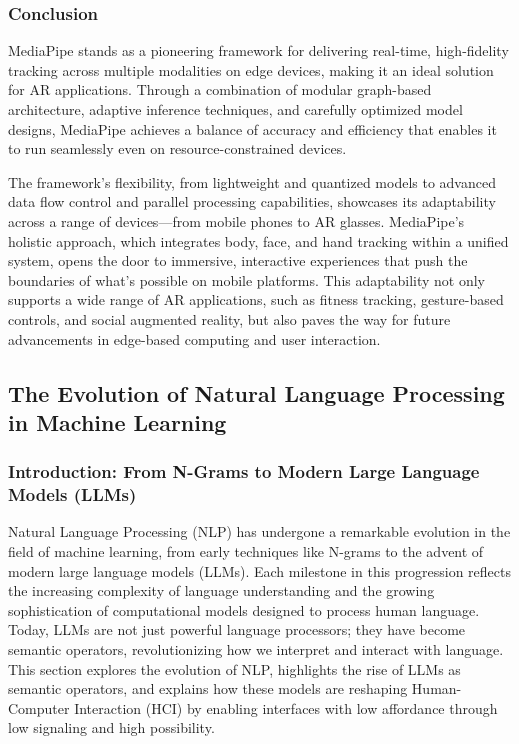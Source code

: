 \subsubsection{ Conclusion }

MediaPipe stands as a pioneering framework for delivering real-time, high-fidelity tracking across multiple modalities on edge devices, making it an ideal solution for AR applications.
Through a combination of modular graph-based architecture, adaptive inference techniques, and carefully optimized model designs, MediaPipe achieves a balance of accuracy and efficiency that enables it to run seamlessly even on resource-constrained devices.

The framework’s flexibility, from lightweight and quantized models to advanced data flow control and parallel processing capabilities, showcases its adaptability across a range of devices—from mobile phones to AR glasses.
MediaPipe’s holistic approach, which integrates body, face, and hand tracking within a unified system, opens the door to immersive, interactive experiences that push the boundaries of what’s possible on mobile platforms.
This adaptability not only supports a wide range of AR applications, such as fitness tracking, gesture-based controls, and social augmented reality, but also paves the way for future advancements in edge-based computing and user interaction.

\subsection{ The Evolution of Natural Language Processing in Machine Learning}

\subsubsection{ Introduction: From N-Grams to Modern Large Language Models (LLMs)}

Natural Language Processing (NLP) has undergone a remarkable evolution in the field of machine learning, from early techniques like N-grams \cite{Mar13} to the advent of modern large language models (LLMs).
Each milestone in this progression reflects the increasing complexity of language understanding and the growing sophistication of computational models designed to process human language.
Today, LLMs are not just powerful language processors; they have become semantic operators, revolutionizing how we interpret and interact with language. This section explores the evolution of NLP, highlights the rise of LLMs as semantic operators, and explains how these models are reshaping Human-Computer Interaction (HCI) by enabling interfaces with low affordance through low signaling and high possibility.

